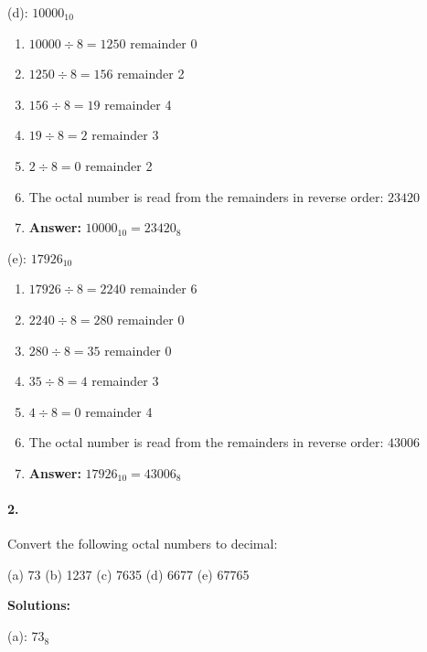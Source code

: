 \documentclass{article}
\begin{document}
\newpage

\noindent (d): $10000_{10}$

\begin{enumerate}
    \item $10000 \div 8 = 1250$ remainder 0
    \item $1250 \div 8 = 156$ remainder 2
    \item $156 \div 8 = 19$ remainder 4
    \item $19 \div 8 = 2$ remainder 3
    \item $2 \div 8 = 0$ remainder 2
    \item The octal number is read from the remainders in reverse order: $23420$
    \item \textbf{Answer:} $10000_{10} = 23420_8$
\end{enumerate}

\vspace*{0.5cm}

\noindent (e): $17926_{10}$

\begin{enumerate}
    \item $17926 \div 8 = 2240$ remainder 6
    \item $2240 \div 8 = 280$ remainder 0
    \item $280 \div 8 = 35$ remainder 0
    \item $35 \div 8 = 4$ remainder 3
    \item $4 \div 8 = 0$ remainder 4
    \item The octal number is read from the remainders in reverse order: $43006$
    \item \textbf{Answer:} $17926_{10} = 43006_8$
\end{enumerate}

\paragraph*{2.}

Convert the following octal numbers to decimal:

\vspace*{0.25cm}

(a) 73 (b) 1237 (c) 7635 (d) 6677 (e) 67765

\vspace*{0.5cm}

\noindent \textbf{Solutions:}

\vspace*{0.25cm}

\noindent (a): $73_8$
\end{document}
